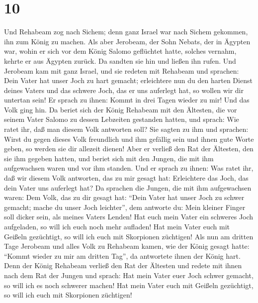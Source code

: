 \hypertarget{section-9}{%
\section{10}\label{section-9}}

 Und Rehabeam zog nach Sichem; denn ganz Israel war nach
Sichem gekommen, ihn zum König zu machen.  Als aber
Jerobeam, der Sohn Nebats, der in Ägypten war, wohin er sich vor dem
König Salomo geflüchtet hatte, solches vernahm, kehrte er aus Ägypten
zurück.  Da sandten sie hin und ließen ihn rufen. Und
Jerobeam kam mit ganz Israel, und sie redeten mit Rehabeam und sprachen:
 Dein Vater hat unser Joch zu hart gemacht; erleichtere
nun du den harten Dienst deines Vaters und das schwere Joch, das er uns
auferlegt hat, so wollen wir dir untertan sein!  Er sprach
zu ihnen: Kommt in drei Tagen wieder zu mir! Und das Volk ging hin.
 Da beriet sich der König Rehabeam mit den Ältesten, die
vor seinem Vater Salomo zu dessen Lebzeiten gestanden hatten, und
sprach: Wie ratet ihr, daß man diesem Volk antworten soll?
 Sie sagten zu ihm und sprachen: Wirst du gegen dieses
Volk freundlich und ihm gefällig sein und ihnen gute Worte geben, so
werden sie dir allezeit dienen!  Aber er verließ den Rat
der Ältesten, den sie ihm gegeben hatten, und beriet sich mit den
Jungen, die mit ihm aufgewachsen waren und vor ihm standen.
 Und er sprach zu ihnen: Was ratet ihr, daß wir diesem
Volk antworten, das zu mir gesagt hat: Erleichtere das Joch, das dein
Vater uns auferlegt hat?  Da sprachen die Jungen, die mit
ihm aufgewachsen waren: Dem Volk, das zu dir gesagt hat: ``Dein Vater
hat unser Joch zu schwer gemacht; mache du unser Joch leichter'', dem
antworte du: Mein kleiner Finger soll dicker sein, als meines Vaters
Lenden!  Hat euch mein Vater ein schweres Joch
aufgeladen, so will ich euch noch mehr aufladen! Hat mein Vater euch mit
Geißeln gezüchtigt, so will ich euch mit Skorpionen züchtigen!
 Als nun am dritten Tage Jerobeam und alles Volk zu
Rehabeam kamen, wie der König gesagt hatte: ``Kommt wieder zu mir am
dritten Tag'',  da antwortete ihnen der König hart. Denn
der König Rehabeam verließ den Rat der Ältesten  und
redete mit ihnen nach dem Rat der Jungen und sprach: Hat mein Vater euer
Joch schwer gemacht, so will ich es noch schwerer machen! Hat mein Vater
euch mit Geißeln gezüchtigt, so will ich euch mit Skorpionen züchtigen!
